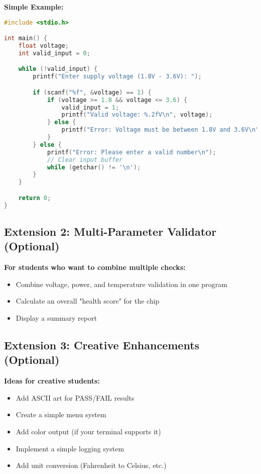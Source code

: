 \documentclass[11pt,a4paper]{article}
\begin{document}
\textbf{Simple Example:}
\begin{lstlisting}[language=C]
#include <stdio.h>

int main() {
    float voltage;
    int valid_input = 0;

    while (!valid_input) {
        printf("Enter supply voltage (1.8V - 3.6V): ");

        if (scanf("%f", &voltage) == 1) {
            if (voltage >= 1.8 && voltage <= 3.6) {
                valid_input = 1;
                printf("Valid voltage: %.2fV\n", voltage);
            } else {
                printf("Error: Voltage must be between 1.8V and 3.6V\n");
            }
        } else {
            printf("Error: Please enter a valid number\n");
            // Clear input buffer
            while (getchar() != '\n');
        }
    }

    return 0;
}
\end{lstlisting}

\subsection{Extension 2: Multi-Parameter Validator (Optional)}

\textbf{For students who want to combine multiple checks:}
\begin{itemize}
    \item Combine voltage, power, and temperature validation in one program
    \item Calculate an overall "health score" for the chip
    \item Display a summary report
\end{itemize}

\subsection{Extension 3: Creative Enhancements (Optional)}

\textbf{Ideas for creative students:}
\begin{itemize}
    \item Add ASCII art for PASS/FAIL results
    \item Create a simple menu system
    \item Add color output (if your terminal supports it)
    \item Implement a simple logging system
    \item Add unit conversion (Fahrenheit to Celsius, etc.)
\end{itemize}
\end{document}
